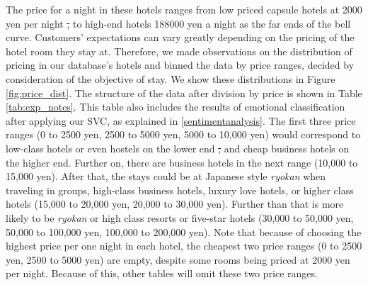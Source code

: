 \documentclass[smallextended,natbib]{svjour3}       %
\providecommand{\DIFdel}[1]{{\protect\color{red}\sout{#1}}}                      %
\providecommand{\DIFdelbegin}{} %
\providecommand{\DIFdelend}{} %
\newcommand{\DIFscaledelfig}{0.5}
\newlength{\DIFdelgraphicswidth} %
\newlength{\DIFdelgraphicsheight} %
\newcommand{\DIFdelincludegraphics}[2][]{%
\sbox{\DIFdelgraphicsbox}{\DIFOincludegraphics[#1]{#2}}%
\settoboxwidth{\DIFdelgraphicswidth}{\DIFdelgraphicsbox} %
\settoboxtotalheight{\DIFdelgraphicsheight}{\DIFdelgraphicsbox} %
\scalebox{\DIFscaledelfig}{%
\parbox[b]{\DIFdelgraphicswidth}{\usebox{\DIFdelgraphicsbox}\\[-\baselineskip] \rule{\DIFdelgraphicswidth}{0em}}\llap{\resizebox{\DIFdelgraphicswidth}{\DIFdelgraphicsheight}{%
\setlength{\unitlength}{\DIFdelgraphicswidth}%
\begin{picture}(1,1)%
\thicklines\linethickness{2pt} %
{\color[rgb]{1,0,0}\put(0,0){\framebox(1,1){}}}%
{\color[rgb]{1,0,0}\put(0,0){\line( 1,1){1}}}%
{\color[rgb]{1,0,0}\put(0,1){\line(1,-1){1}}}%
\end{picture}%
}\hspace*{3pt}}} %
} %
\DeclareRobustCommand{\DIFdelbegin}{\DIFOdelbegin \let\includegraphics\DIFdelincludegraphics} %
\DeclareRobustCommand{\DIFdelend}{\DIFOaddend \let\includegraphics\DIFOincludegraphics} %
\begin{document}
    The price for a night in these hotels ranges from low priced capsule hotels at 2000 yen per night \DIFdelbegin \DIFdel{, }\DIFdelend to high-end hotels \num[group-separator={,}]{188000} yen a night as the far ends of the bell curve. Customers' expectations can vary greatly depending on the pricing of the hotel room they stay at. Therefore, we made observations on the distribution of pricing in our database's hotels and binned the data by price ranges, decided by consideration of the objective of stay. We show these distributions in Figure \ref{fig:price_dist}. The structure of the data after division by price is shown in Table \ref{tab:exp_notes}. This table also includes the results of emotional classification after applying our SVC, as explained in \ref{sentimentanalysis}. The first three price ranges (0 to 2500 yen, 2500 to 5000 yen, 5000 to 10,000 yen) would correspond to low-class hotels or even hostels on the lower end \DIFdelbegin \DIFdel{, }\DIFdelend and cheap business hotels on the higher end. Further on, there are business hotels in the next range (10,000 to 15,000 yen). After that, the stays could be at Japanese style \textit{ryokan} when traveling in groups, high-class business hotels, luxury love hotels, or higher class hotels (15,000 to 20,000 yen, 20,000 to 30,000 yen). Further than that is more likely to be \textit{ryokan} or high class resorts or five-star hotels (30,000 to 50,000 yen, 50,000 to 100,000 yen, 100,000 to 200,000 yen). Note that because of choosing the highest price per one night in each hotel, the cheapest two price ranges (0 to 2500 yen, 2500 to 5000 yen) are empty, despite some rooms being priced at 2000 yen per night. Because of this, other tables will omit these two price ranges.
\end{document}

